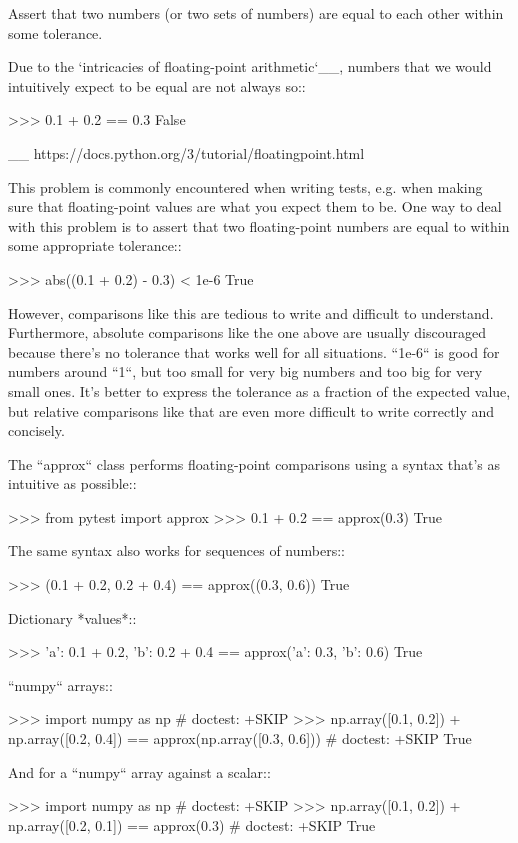 \begin{DoxyVerb}Assert that two numbers (or two sets of numbers) are equal to each other
within some tolerance.

Due to the `intricacies of floating-point arithmetic`__, numbers that we
would intuitively expect to be equal are not always so::

    >>> 0.1 + 0.2 == 0.3
    False

__ https://docs.python.org/3/tutorial/floatingpoint.html

This problem is commonly encountered when writing tests, e.g. when making
sure that floating-point values are what you expect them to be.  One way to
deal with this problem is to assert that two floating-point numbers are
equal to within some appropriate tolerance::

    >>> abs((0.1 + 0.2) - 0.3) < 1e-6
    True

However, comparisons like this are tedious to write and difficult to
understand.  Furthermore, absolute comparisons like the one above are
usually discouraged because there's no tolerance that works well for all
situations.  ``1e-6`` is good for numbers around ``1``, but too small for
very big numbers and too big for very small ones.  It's better to express
the tolerance as a fraction of the expected value, but relative comparisons
like that are even more difficult to write correctly and concisely.

The ``approx`` class performs floating-point comparisons using a syntax
that's as intuitive as possible::

    >>> from pytest import approx
    >>> 0.1 + 0.2 == approx(0.3)
    True

The same syntax also works for sequences of numbers::

    >>> (0.1 + 0.2, 0.2 + 0.4) == approx((0.3, 0.6))
    True

Dictionary *values*::

    >>> {'a': 0.1 + 0.2, 'b': 0.2 + 0.4} == approx({'a': 0.3, 'b': 0.6})
    True

``numpy`` arrays::

    >>> import numpy as np                                                          # doctest: +SKIP
    >>> np.array([0.1, 0.2]) + np.array([0.2, 0.4]) == approx(np.array([0.3, 0.6])) # doctest: +SKIP
    True

And for a ``numpy`` array against a scalar::

    >>> import numpy as np                                         # doctest: +SKIP
    >>> np.array([0.1, 0.2]) + np.array([0.2, 0.1]) == approx(0.3) # doctest: +SKIP
    True


\end{DoxyVerb}

